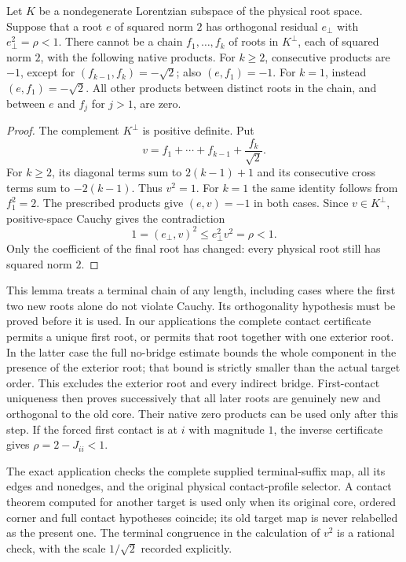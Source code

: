 \begin{lemma}
\label{lem:terminal-b-tail}
Let $K$ be a nondegenerate Lorentzian subspace of the physical root space.
Suppose that a root $e$ of squared norm $2$ has orthogonal residual
$e_\perp$ with $e_\perp^2=\rho<1$. There cannot be a chain
$f_1,\ldots,f_k$ of roots in $K^\perp$, each of squared norm $2$,
with the following native products. For $k\ge2$, consecutive products
are $-1$, except for $(f_{k-1},f_k)=-\sqrt2$; also
$(e,f_1)=-1$. For $k=1$, instead $(e,f_1)=-\sqrt2$.
All other products between distinct roots in the chain, and between
$e$ and $f_j$ for $j>1$, are zero.
\end{lemma}

\begin{proof}
The complement $K^\perp$ is positive definite. Put
\[
 v=f_1+\cdots+f_{k-1}+\frac{f_k}{\sqrt2}.
\]
For $k\ge2$, its diagonal terms sum to $2(k-1)+1$ and its
consecutive cross terms sum to $-2(k-1)$. Thus $v^2=1$.
For $k=1$ the same identity follows from $f_1^2=2$.
The prescribed products give $(e,v)=-1$ in both cases.
Since $v\in K^\perp$, positive-space Cauchy gives the contradiction
\[
 1=(e_\perp,v)^2\le e_\perp^2v^2=\rho<1.
\]
Only the coefficient of the final root has changed: every physical
root still has squared norm $2$.
\end{proof}

This lemma treats a terminal chain of any length, including cases where
the first two new roots alone do not violate Cauchy. Its orthogonality
hypothesis must be proved before it is used. In our applications the
complete contact certificate permits a unique first root, or permits
that root together with one exterior root. In the latter case the
full no-bridge estimate bounds the whole component in the presence of
the exterior root; that bound is strictly smaller than the actual target
order. This excludes the exterior root and every indirect bridge.
First-contact uniqueness then proves successively that all later roots
are genuinely new and orthogonal to the old core. Their native zero
products can be used only after this step. If the forced first contact
is at $i$ with magnitude $1$, the inverse certificate gives
$\rho=2-J_{ii}<1$.

The exact application checks the complete supplied terminal-suffix map,
all its edges and nonedges, and the original physical contact-profile
selector. A contact theorem computed for another target is used only
when its original core, ordered corner and full contact hypotheses
coincide; its old target map is never relabelled as the present one.
The terminal congruence in the calculation of $v^2$ is a rational check,
with the scale $1/\sqrt2$ recorded explicitly.

